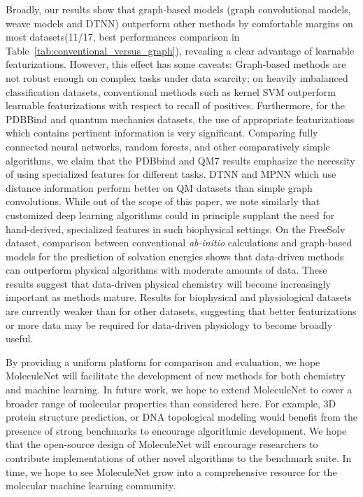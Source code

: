 Broadly, our results show that graph-based models (graph convolutional models, weave models and DTNN) outperform other methods by comfortable margins on most datasets(11/17, best performances comparison in Table~\ref{tab:conventional_versus_graph}), revealing a clear advantage of learnable featurizations. However, this effect has some caveats: Graph-based methods are not robust enough on complex tasks under data scarcity; on heavily imbalanced classification datasets, conventional methods such as kernel SVM outperform learnable featurizations with respect to recall of positives. Furthermore, for the PDBBind and quantum mechanics datasets, the use of appropriate featurizations which contains pertinent information is very significant. Comparing fully connected neural networks, random forests, and other comparatively simple algorithms, we claim that the PDBbind and QM7 results emphasize the necessity of using specialized features for different tasks. DTNN and MPNN which use distance information perform better on QM datasets than simple graph convolutions. While out of the scope of this paper, we note similarly that customized deep learning algorithms \cite{AtomNet} could in principle supplant the need for hand-derived, specialized features in such biophysical settings. On the FreeSolv dataset, comparison between conventional \textit{ab-initio} calculations and graph-based models for the prediction of solvation energies shows that data-driven methods can outperform physical algorithms with moderate amounts of data. These results suggest that data-driven physical chemistry will become increasingly important as methods mature. Results for biophysical and physiological datasets are currently weaker than for other datasets, suggesting that better featurizations or more data may be required for data-driven physiology to become broadly useful.


By providing a uniform platform for comparison and evaluation, we hope MoleculeNet will facilitate the development of new methods for both chemistry and machine learning. In future work, we hope to extend MoleculeNet to cover a broader range of molecular properties than considered here. For example, 3D protein structure prediction, or DNA topological modeling would benefit from the presence of strong benchmarks to encourage algorithmic development. We hope that the open-source design of MoleculeNet will encourage researchers to contribute implementations of other novel algorithms to the benchmark suite. In time, we hope to see MoleculeNet grow into a comprehensive resource for the molecular machine learning community.

